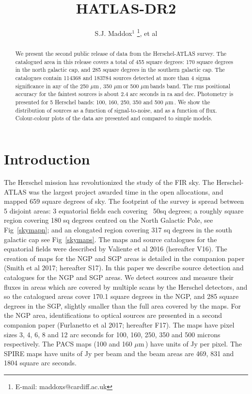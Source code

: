 \documentclass[useAMS,usenatbib]{mn2e}
\title[The Herschel--ATLAS 2nd data release]{HATLAS-DR2}
\author[S.J. Maddox]{\parbox{\textwidth}{S.J. Maddox$^{1}$
\thanks{E-mail: maddoxs@cardiff.ac.uk}, et al }}
\def\mic{ $\mu $m\,}
\begin{document}
\date{}

\pagerange{\pageref{firstpage}--\pageref{lastpage}} 

\maketitle

\label{firstpage}

\begin{abstract}
We present the second public release of data from the Herschel-ATLAS
survey. The catalogued area in this release covers a total of 455 square
degrees: 170 square degrees in the north galactic cap, and 285 square
degrees in the southern galactic cap. The catalogues contain 114368
and 183784 sources detected at more than 4 sigma significance in any
of the 250\mic, 350\mic or 500\mic bands band. The rms positional
accuracy for the faintest sources is about 2.4 arc seconds in ra and
dec. Photometry is presented for 5 Herschel bands: 100, 160, 250, 350
and 500\mic. We show the distribution of sources as a function of
signal-to-noise, and as a function of flux. Colour-colour plots of the
data are presented and compared to simple models.



\end{abstract}

\begin{keywords}

\end{keywords}

\section{Introduction}

The Herschel mission has revolutionized the study of the FIR sky. The
Herschel-ATLAS was the largest project awarded time in the open
allocations, and mapped 659 square degrees of sky.  The footprint of
the survey is spread between 5 disjoint areas: 3 equatorial fields
each covering ~50sq degrees; a roughly square region covering 180 sq
degrees centred on the North Galactic Pole, see Fig~\ref{skymapn}; and
an elongated region covering 317 sq degrees in the south galactic cap
see Fig~\ref{skymaps}.  The maps and source catalogues for the
equatorial fields were described by Valiente et al 2016 (hereafter V16).  The
creation of maps for the NGP and SGP areas is detailed in the
companion paper (Smith et al 2017; hereafter S17). In this paper we
describe source detection and catalogues for the NGP and SGP areas. We
detect sources and measure their fluxes in areas which are covered by
multiple scans by the Herschel detectors, and so the catalogued areas
cover 170.1 square degrees in the NGP, and 285 square degrees in the
SGP, slightly smaller than the full area covered by the maps. For the
NGP area, identifications to optical sources are presented in a second
companion paper (Furlanetto et al 2017; hereafter F17). The maps have
pixel sizes 3, 4, 6, 8 and 12 arc seconds for 100, 160, 250, 350 and
500 microns respectively. The PACS maps (100 and 160\mic) have units
of Jy per pixel. The SPIRE maps have units of Jy per beam and the beam
areas are 469, 831 and 1804 square arc seconds.
\end{document}

